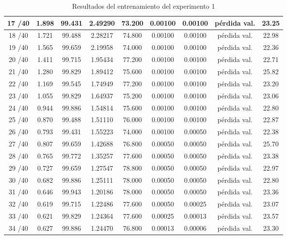 \begin{table}[ht]
\begin{tabular}{|c|c|c|c|c|c|c|c|c|}
        17 /40 & 1.898  & 99.431 & 2.49290 & 73.200 & 0.00100 & 0.00100 & pérdida val. & 23.25  \\ \hline
        18 /40 & 1.721  & 99.488 & 2.28217 & 74.800 & 0.00100 & 0.00100 & pérdida val. & 22.98  \\ \hline
        19 /40 & 1.565  & 99.659 & 2.19958 & 74.000 & 0.00100 & 0.00100 & pérdida val. & 22.36  \\ \hline
        20 /40 & 1.411  & 99.715 & 1.95434 & 77.200 & 0.00100 & 0.00100 & pérdida val. & 22.71  \\ \hline
        21 /40 & 1.280  & 99.829 & 1.89412 & 75.600 & 0.00100 & 0.00100 & pérdida val. & 25.82  \\ \hline
        22 /40 & 1.169  & 99.545 & 1.74949 & 77.200 & 0.00100 & 0.00100 & pérdida val. & 23.20  \\ \hline
        23 /40 & 1.055  & 99.829 & 1.64937 & 75.200 & 0.00100 & 0.00100 & pérdida val. & 23.06  \\ \hline
        24 /40 & 0.944  & 99.886 & 1.54814 & 75.600 & 0.00100 & 0.00100 & pérdida val. & 22.80  \\ \hline
        25 /40 & 0.870  & 99.488 & 1.51110 & 76.000 & 0.00100 & 0.00100 & pérdida val. & 22.87  \\ \hline
        26 /40 & 0.793  & 99.431 & 1.55223 & 74.000 & 0.00100 & 0.00050 & pérdida val. & 22.38  \\ \hline
        27 /40 & 0.807  & 99.659 & 1.42688 & 76.800 & 0.00050 & 0.00050 & pérdida val. & 25.70  \\ \hline
        28 /40 & 0.765  & 99.772 & 1.35257 & 77.600 & 0.00050 & 0.00050 & pérdida val. & 23.38  \\ \hline
        29 /40 & 0.727  & 99.659 & 1.27547 & 78.800 & 0.00050 & 0.00050 & pérdida val. & 22.97  \\ \hline
        30 /40 & 0.682  & 99.886 & 1.25111 & 78.000 & 0.00050 & 0.00050 & pérdida val. & 22.80  \\ \hline
        31 /40 & 0.646  & 99.943 & 1.20186 & 78.000 & 0.00050 & 0.00050 & pérdida val. & 23.36  \\ \hline
        32 /40 & 0.619  & 99.715 & 1.22486 & 77.600 & 0.00050 & 0.00025 & pérdida val. & 23.07  \\ \hline
        33 /40 & 0.621  & 99.829 & 1.24364 & 77.600 & 0.00025 & 0.00013 & pérdida val. & 23.57  \\ \hline
        34 /40 & 0.627  & 99.886 & 1.24470 & 76.800 & 0.00013 & 0.00006 & pérdida val. & 23.30  \\ \hline
        \end{tabular}
        \caption{Resultados del entrenamiento del experimento 1}
        \label{tab:training_results_b1}
        \end{table}

